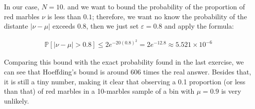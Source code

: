 \documentclass[12pt,letterpaper]{article}
\begin{document}
	In our case, $N=10$. and we want to bound the probability of the proportion of red marbles $\nu$ is less than $0.1$; therefore, we want no know the probability of the distante $|\nu-\mu|$ exceeds $0.8$, then we just set $\varepsilon=0.8$ and apply the formula:
	
	\begin{align*}
		\mathbb{P}[|\nu-\mu|>0.8]\leq 2 e^{-20(0.8)^2}=2e^{-12.8}\approx 5.521 \times 10^{-6}
	\end{align*}
	
	Comparing this bound with the exact probability found in the last exercise, we can see that Hoeffding's bound is around 606 times the real answer. Besides that, it is still a tiny number, making it clear that observing a 0.1 proportion (or less than that) of red marbles in a 10-marbles sample of a bin with $\mu=0.9$ is very unlikely. 
\newpage



\end{document}
